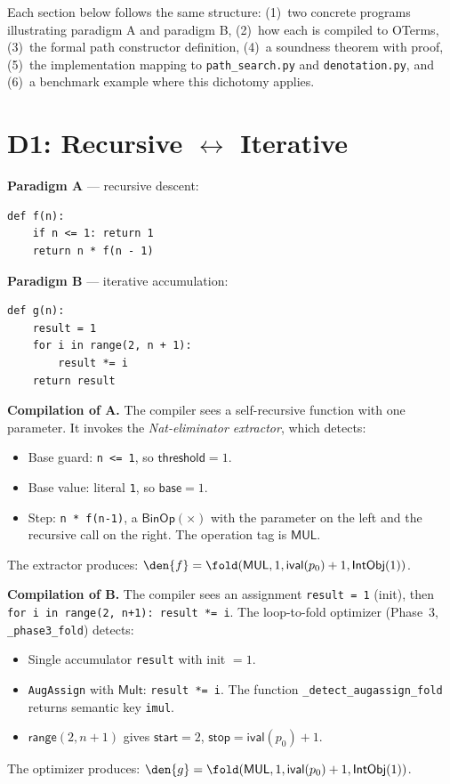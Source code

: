 Each section below follows the same structure: (1)~two concrete programs
illustrating paradigm A and paradigm B, (2)~how each is compiled to
OTerms, (3)~the formal path constructor definition, (4)~a soundness
theorem with proof, (5)~the implementation mapping to
\texttt{path\_search.py} and \texttt{denotation.py}, and (6)~a benchmark
example where this dichotomy applies.

\section{D1: Recursive $\leftrightarrow$ Iterative}
\label{sec:d1}

\textbf{Paradigm A} --- recursive descent:
\begin{lstlisting}
def f(n):
    if n <= 1: return 1
    return n * f(n - 1)
\end{lstlisting}

\textbf{Paradigm B} --- iterative accumulation:
\begin{lstlisting}
def g(n):
    result = 1
    for i in range(2, n + 1):
        result *= i
    return result
\end{lstlisting}

\textbf{Compilation of A.}
The compiler sees a self-recursive function with one parameter.  It
invokes the \emph{Nat-eliminator extractor}, which detects:
\begin{itemize}
  \item Base guard: \texttt{n <= 1}, so $\mathsf{threshold} = 1$.
  \item Base value: literal \texttt{1}, so $\mathsf{base} = 1$.
  \item Step: \texttt{n * f(n-1)}, a $\mathsf{BinOp}(\times)$ with
    the parameter on the left and the recursive call on the right.
    The operation tag is $\mathsf{MUL}$.
\end{itemize}
The extractor produces: $\den{f} = \fold(\mathsf{MUL}, 1,
\mathsf{ival}(p_0) + 1, \mathsf{IntObj}(1))$.

\textbf{Compilation of B.}
The compiler sees an assignment \texttt{result = 1} (init), then
\texttt{for i in range(2, n+1): result *= i}.  The loop-to-fold
optimizer (Phase~3, \texttt{\_phase3\_fold}) detects:
\begin{itemize}
  \item Single accumulator \texttt{result} with init $= 1$.
  \item \texttt{AugAssign} with $\mathsf{Mult}$: \texttt{result *= i}.
    The function \texttt{\_detect\_augassign\_fold} returns semantic
    key \texttt{imul}.
  \item $\mathsf{range}(2, n+1)$ gives $\mathsf{start} = 2$,
    $\mathsf{stop} = \mathsf{ival}(p_0) + 1$.
\end{itemize}
The optimizer produces: $\den{g} = \fold(\mathsf{MUL}, 1,
\mathsf{ival}(p_0) + 1, \mathsf{IntObj}(1))$.

